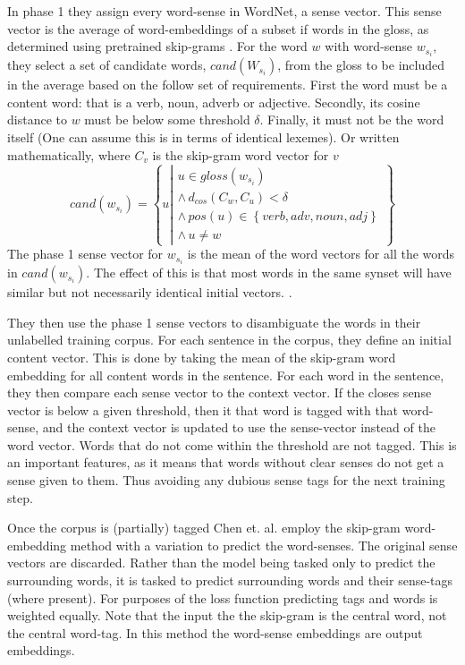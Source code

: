 \documentclass[12pt,parskip]{komatufte}
\begin{document}
In phase 1 they assign every word-sense in WordNet, a sense vector.
This sense vector is the average of word-embeddings of a subset if words in the gloss,
as determined using pretrained skip-grams \parencite{mikolov2013efficient}.
For the word $w$ with word-sense $w_{s_i}$,
they select a set of candidate words, $cand(W_{s_i})$, from the gloss to be included in the average
based on the follow set of requirements.
First the word must be a content word: that is a verb, noun, adverb or adjective.
Secondly, its cosine distance to $w$ must be below some threshold $\delta$.
Finally, it must not be the word itself (One can assume this is in terms of identical lexemes).
Or written mathematically, where $C_v$ is the skip-gram word vector for $v$
\begin{equation}
cand(w_{s_{i}})=\left\{ u\left|\begin{array}{c}
u\in gloss(w_{s_{i}})\\
\wedge\, d_{cos}(C_w,C_u)<\delta\\
\wedge\, pos(u)\in\left\{ verb,adv,noun,adj\right\} \\
\wedge\, u\ne w
\end{array}\right.\right\} 
\end{equation}
The phase 1 sense vector for $w_{s_i}$ is the mean of the word vectors for all the words in $cand(w_{s_{i}})$.
The effect of this is that most words in the same synset will have similar but not necessarily identical initial vectors.
.



They then use the phase 1 sense vectors to disambiguate the words in their unlabelled training corpus.
For each sentence in the corpus, they define an initial content vector.
This is done by taking the mean of the skip-gram word embedding for all content words in the sentence.
For each word in the sentence, they then compare each sense vector to the context vector.
If the closes sense vector is below a given threshold,
then it that word is tagged with that word-sense, and the context vector is updated to use the sense-vector instead of the word vector.
Words that do not come within the threshold are not tagged.
This is an important features, as it means that words without clear senses do not get a sense given to them.
Thus avoiding any dubious sense tags for the next training step.


Once the corpus is (partially) tagged Chen et. al. employ the skip-gram word-embedding method with a variation to predict the word-senses.
The original sense vectors are discarded.
Rather than the model being tasked only to predict the surrounding words,
it is tasked to predict surrounding words and their sense-tags (where present).
For purposes of the loss function predicting tags and words is weighted equally.
Note that the input the the skip-gram is the central word, not the central word-tag.
In this method the word-sense embeddings are output embeddings.
\end{document}
